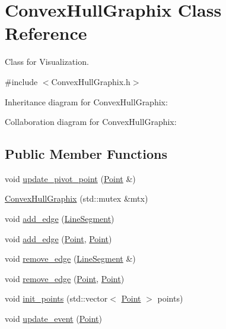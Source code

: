 \hypertarget{class_convex_hull_graphix}{}\section{Convex\+Hull\+Graphix Class Reference}
\label{class_convex_hull_graphix}


Class for Visualization.  




{\ttfamily \#include $<$Convex\+Hull\+Graphix.\+h$>$}



Inheritance diagram for Convex\+Hull\+Graphix\+:


Collaboration diagram for Convex\+Hull\+Graphix\+:
\subsection*{Public Member Functions}
\begin{DoxyCompactItemize}
\item 
void \mbox{\hyperlink{class_convex_hull_graphix_a463b42e0cafea416fa9a193e5efed532}{update\+\_\+pivot\+\_\+point}} (\mbox{\hyperlink{class_point}{Point}} \&)
\item 
\mbox{\hyperlink{class_convex_hull_graphix_a0788aec48348b01f660d3f6e08724c0c}{Convex\+Hull\+Graphix}} (std\+::mutex \&mtx)
\item 
void \mbox{\hyperlink{class_convex_hull_graphix_ab86fe28af236abd45c987599920bfe39}{add\+\_\+edge}} (\mbox{\hyperlink{class_line_segment}{Line\+Segment}})
\item 
void \mbox{\hyperlink{class_convex_hull_graphix_abd57f96a83ba7c4aa4da7cc00bf1530f}{add\+\_\+edge}} (\mbox{\hyperlink{class_point}{Point}}, \mbox{\hyperlink{class_point}{Point}})
\item 
void \mbox{\hyperlink{class_convex_hull_graphix_a80800d54bcbd5031eaef916d52c73139}{remove\+\_\+edge}} (\mbox{\hyperlink{class_line_segment}{Line\+Segment}} \&)
\item 
void \mbox{\hyperlink{class_convex_hull_graphix_a35c4a800c524d5ff2001d3724791bf66}{remove\+\_\+edge}} (\mbox{\hyperlink{class_point}{Point}}, \mbox{\hyperlink{class_point}{Point}})
\item 
void \mbox{\hyperlink{class_convex_hull_graphix_ac9c25b9e69637f4ffa4cb9515a0fb221}{init\+\_\+points}} (std\+::vector$<$ \mbox{\hyperlink{class_point}{Point}} $>$ points)
\item 
void \mbox{\hyperlink{class_convex_hull_graphix_a72101c075bb4fca0db552e888d1530b3}{update\+\_\+event}} (\mbox{\hyperlink{class_point}{Point}})
\end{DoxyCompactItemize}
